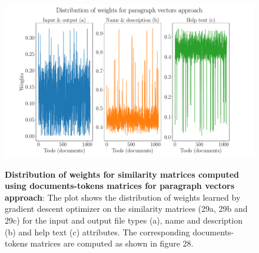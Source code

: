 \begin{figure}[h]
\begin{centering}
    {\includegraphics[scale=0.37]{figures/Weights_doc2vec.pdf}}
    \caption[Distribution of weights for similarity matrices computed using documents-tokens matrices for paragraph vectors approach]{\textbf{Distribution of weights for similarity matrices computed using documents-tokens matrices for paragraph vectors approach}: The plot shows the distribution of weights learned by gradient descent optimizer on the similarity matrices (29a, 29b and 29c) for the input and output file types (a), name and description (b) and help text (c) attributes. The corresponding documents-tokens matrices are computed as shown in figure 28.}
\end{centering}
\end{figure}


